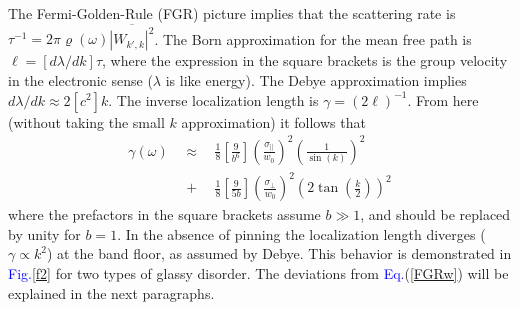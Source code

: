 \documentclass[twocolumn,showpacs,aps,pre]{revtex4-1}
\newcommand{\beq}{\begin{eqnarray}}
\newcommand{\eeq}{\end{eqnarray}}
\newcommand{\Eq}[1]{{\textcolor{blue}{Eq.}}(\ref{#1})}
\newcommand{\Fig}[1] {{\textcolor{blue}{Fig.}}\ref{#1}}
\begin{document}
The Fermi-Golden-Rule (FGR) picture implies that 
the scattering rate is ${\tau^{-1}= 2\pi \varrho(\omega) \overline{\left|W_{k',k}\right|^2}}$. 
%
The Born approximation for the mean free path is ${\ell=[d\lambda/dk]\tau}$, 
where the expression in the square brackets is the group velocity 
in the electronic sense ($\lambda$ is like energy). 
The Debye approximation implies $d\lambda/dk \approx 2[c^2]k$.
% 
The inverse localization length is $\gamma=(2\ell)^{-1}$. 
From here (without taking the small $k$ approximation) it follows that 
%
\beq \label{FGRv}
\gamma(\omega) \ \ &\approx& \ \ 
\frac{1}{8}\left[\frac{9}{b^6}\right]\left(\frac{\sigma_{\parallel}}{w_0}\right)^2  \left(\frac{1}{\sin(k)}\right)^2
\\ \label{FGRw} &+& \ \ 
\frac{1}{8}\left[\frac{9}{5b}\right]\left(\frac{\sigma_{\perp}}{w_0}\right)^2  \left( 2\tan\left(\frac{k}{2}\right) \right)^2
\eeq
%
where the prefactors in the square brackets assume ${b\gg1}$, and should be replaced by unity for ${b=1}$.
In the absence of pinning the localization length diverges ($\gamma \propto k^2$) 
at the band floor, as assumed by Debye. This behavior is demonstrated in \Fig{f2} 
for two types of glassy disorder. The deviations from \Eq{FGRw} 
will be explained in the next paragraphs. 
\end{document}
